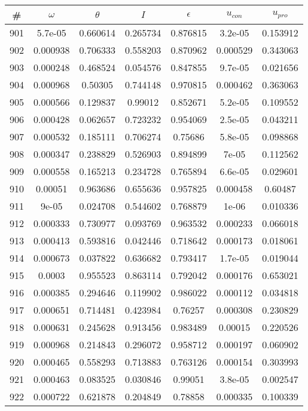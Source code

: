\newpage
\begin{table}
\begin{tabular}{c|c|c|c|c|c|c}
\# & $\omega$ & $\theta$ & $I$ & $\epsilon$ & $u_{con}$ & $u_{pro}$\\
\hline
901 & 5.7e-05 & 0.660614 & 0.265734 & 0.876815 & 3.2e-05 & 0.153912\\
902 & 0.000938 & 0.706333 & 0.558203 & 0.870962 & 0.000529 & 0.343063\\
903 & 0.000248 & 0.468524 & 0.054576 & 0.847855 & 9.7e-05 & 0.021656\\
904 & 0.000968 & 0.50305 & 0.744148 & 0.970815 & 0.000462 & 0.363063\\
905 & 0.000566 & 0.129837 & 0.99012 & 0.852671 & 5.2e-05 & 0.109552\\
906 & 0.000428 & 0.062657 & 0.723232 & 0.954069 & 2.5e-05 & 0.043211\\
907 & 0.000532 & 0.185111 & 0.706274 & 0.75686 & 5.8e-05 & 0.098868\\
908 & 0.000347 & 0.238829 & 0.526903 & 0.894899 & 7e-05 & 0.112562\\
909 & 0.000558 & 0.165213 & 0.234728 & 0.765894 & 6.6e-05 & 0.029601\\
910 & 0.00051 & 0.963686 & 0.655636 & 0.957825 & 0.000458 & 0.60487\\
911 & 9e-05 & 0.024708 & 0.544602 & 0.768879 & 1e-06 & 0.010336\\
912 & 0.000333 & 0.730977 & 0.093769 & 0.963532 & 0.000233 & 0.066018\\
913 & 0.000413 & 0.593816 & 0.042446 & 0.718642 & 0.000173 & 0.018061\\
914 & 0.000673 & 0.037822 & 0.636682 & 0.793417 & 1.7e-05 & 0.019044\\
915 & 0.0003 & 0.955523 & 0.863114 & 0.792042 & 0.000176 & 0.653021\\
916 & 0.000385 & 0.294646 & 0.119902 & 0.986022 & 0.000112 & 0.034818\\
917 & 0.000651 & 0.714481 & 0.423984 & 0.76257 & 0.000308 & 0.230829\\
918 & 0.000631 & 0.245628 & 0.913456 & 0.983489 & 0.00015 & 0.220526\\
919 & 0.000968 & 0.214843 & 0.296072 & 0.958712 & 0.000197 & 0.060902\\
920 & 0.000465 & 0.558293 & 0.713883 & 0.763126 & 0.000154 & 0.303993\\
921 & 0.000463 & 0.083525 & 0.030846 & 0.99051 & 3.8e-05 & 0.002547\\
922 & 0.000722 & 0.621878 & 0.204849 & 0.78858 & 0.000335 & 0.100339\\

\end{tabular}
\end{table}
